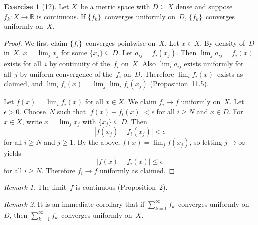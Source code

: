 \documentclass[letterpaper,12pt]{article}
\newcommand{\R}{\mathbb{R}}
\newcommand{\abs}[1]{|{#1}|}
\theoremstyle{plain}
\theoremstyle{definition}
\newtheorem*{exer}{Exercise}
\theoremstyle{remark}
\newtheorem*{rmk}{Remark}
\begin{document}
\begin{exer}[12]
Let \(X\)~be a metric space with \(D\subseteq X\) dense and suppose \(f_k:X\to\R\) is continuous. If \(\{f_k\}\)~converges uniformly on~\(D\), \(\{f_k\}\)~converges uniformly on~\(X\).
\end{exer}
\begin{proof}
We first claim \(\{f_i\}\)~converges pointwise on~\(X\). Let \(x\in X\). By density of~\(D\) in~\(X\), \(x=\lim_j x_j\) for some \(\{x_j\}\subseteq D\). Let \(a_{ij}=f_i(x_j)\). Then \(\lim_j a_{ij}=f_i(x)\) exists for all~\(i\) by continuity of the~\(f_i\) on~\(X\). Also \(\lim_i a_{ij}\) exists uniformly for all~\(j\) by uniform convergence of the~\(f_i\) on~\(D\). Therefore \(\lim_i f_i(x)\)~exists as claimed, and \(\lim_i f_i(x)=\lim_j\lim_i f_i(x_j)\) (Proposition~11.5).

Let \(f(x)=\lim_i f_i(x)\) for all \(x\in X\). We claim \(f_i\to f\) uniformly on~\(X\). Let \(\epsilon>0\). Choose~\(N\) such that \(\abs{f(x)-f_i(x)}<\epsilon\) for all \(i\ge N\) and \(x\in D\). For \(x\in X\), write \(x=\lim_j x_j\) with \(\{x_j\}\subseteq D\). Then
\[\abs{f(x_j)-f_i(x_j)}<\epsilon\]
for all \(i\ge N\) and \(j\ge 1\). By the above, \(f(x)=\lim_j f(x_j)\), so letting \(j\to\infty\) yields
\[\abs{f(x)-f_i(x)}\le\epsilon\]
for all \(i\ge N\). Therefore \(f_i\to f\) uniformly as claimed.
\end{proof}
\begin{rmk}
The limit~\(f\) is continuous (Proposition~2).
\end{rmk}
\begin{rmk}
It is an immediate corollary that if \(\sum_{k=1}^{\infty}f_k\)~converges uniformly on~\(D\), then \(\sum_{k=1}^{\infty}f_k\)~converges uniformly on~\(X\).
\end{rmk}
\end{document}
